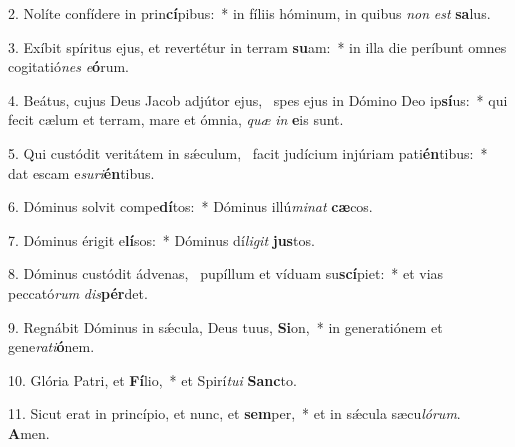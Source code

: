 2. Nolíte confídere in prin\textbf{cí}pibus:~*  in fíliis hóminum, in quibus \textit{non} \textit{est} \textbf{sa}lus.\

3. Exíbit spíritus ejus, et revertétur in terram \textbf{su}am:~*  in illa die períbunt omnes cogitatió\textit{nes} \textit{e}\textbf{ó}rum.\

4. Beátus, cujus Deus Jacob adjútor ejus, \dag\  spes ejus in Dómino Deo ip\textbf{sí}us:~*  qui fecit cælum et terram, mare et ómnia, \textit{quæ} \textit{in} \textbf{e}is sunt.\

5. Qui custódit veritátem in sǽculum, \dag\  facit judícium injúriam pati\textbf{én}tibus:~*  dat escam e\textit{su}\textit{ri}\textbf{én}tibus.\

6. Dóminus solvit compe\textbf{dí}tos:~*  Dóminus illú\textit{mi}\textit{nat} \textbf{cæ}cos.\

7. Dóminus érigit e\textbf{lí}sos:~*  Dóminus dí\textit{li}\textit{git} \textbf{jus}tos.\

8. Dóminus custódit ádvenas, \dag\  pupíllum et víduam su\textbf{scí}piet:~*  et vias peccató\textit{rum} \textit{dis}\textbf{pér}det.\

9. Regnábit Dóminus in sǽcula, Deus tuus, \textbf{Si}on,~*  in generatiónem et gene\textit{ra}\textit{ti}\textbf{ó}nem.\

10. Glória Patri, et \textbf{Fí}lio,~*  et Spirí\textit{tu}\textit{i} \textbf{Sanc}to.\

11. Sicut erat in princípio, et nunc, et \textbf{sem}per,~*  et in sǽcula sæcu\textit{ló}\textit{rum}. \textbf{A}men.\

